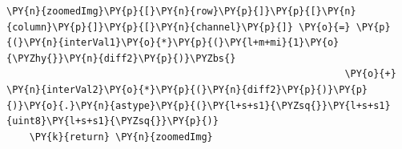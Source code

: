 \documentclass[a4paper,10pt]{article}%
\begin{document}
\begin{tcolorbox}[breakable, size=fbox, boxrule=1pt, pad at break*=1mm,colback=cellbackground, colframe=cellborder]
\begin{Verbatim}[commandchars=\\\{\}]
                        \PY{n}{zoomedImg}\PY{p}{[}\PY{n}{row}\PY{p}{]}\PY{p}{[}\PY{n}{column}\PY{p}{]}\PY{p}{[}\PY{n}{channel}\PY{p}{]} \PY{o}{=} \PY{p}{(}\PY{n}{interVal1}\PY{o}{*}\PY{p}{(}\PY{l+m+mi}{1}\PY{o}{\PYZhy{}}\PY{n}{diff2}\PY{p}{)}\PYZbs{}
                                                           \PY{o}{+} \PY{n}{interVal2}\PY{o}{*}\PY{p}{(}\PY{n}{diff2}\PY{p}{)}\PY{p}{)}\PY{o}{.}\PY{n}{astype}\PY{p}{(}\PY{l+s+s1}{\PYZsq{}}\PY{l+s+s1}{uint8}\PY{l+s+s1}{\PYZsq{}}\PY{p}{)}
    \PY{k}{return} \PY{n}{zoomedImg}
\end{Verbatim}
\end{tcolorbox}

    
\end{document}

